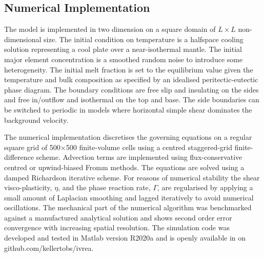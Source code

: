 \documentclass[12pt,a4paper]{article}
\begin{document}
\subsection{Numerical Implementation}

The model is implemented in two dimension on a square domain of $L \times L$ non-dimensional size. The initial condition on temperature is a halfspace  cooling solution representing a cool plate over a near-isothermal mantle. The initial major element concentration is a smoothed random noise to introduce some heterogeneity. The initial melt fraction is set to the equilibrium value given the temperature and bulk composition as specified by an idealised peritectic-eutectic phase diagram. The boundary conditions are free slip and insulating on the sides and free in/outflow and isothermal on the top and base. The side boundaries can be switched to periodic in models where horizontal simple shear dominates the background velocity.

The numerical implementation discretises the governing equations on a regular square grid of 500$\times$500 finite-volume cells using a centred staggered-grid finite-difference scheme. Advection terms are implemented using flux-conservative centred or upwind-biased Fromm methods. The equations are solved using a damped Richardson iterative scheme. For reasons of numerical stability the shear visco-plasticity, $\eta$, and the phase reaction rate, $\Gamma$, are regularised by applying a small amount of Laplacian smoothing and lagged iteratively to avoid numerical oscillations. The mechanical part of the numerical algorithm was benchmarked against a manufactured analytical solution and shows second order error convergence with increasing spatial resolution. The simulation code was developed and tested in Matlab version R2020a and is openly available in on github.com/kellertobs/ivrea.


%
%
\end{document}
